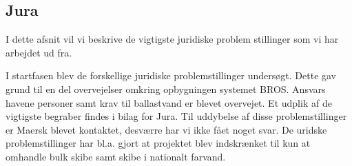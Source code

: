 \subsection{Jura}
I dette afsnit vil vi beskrive de vigtigste juridiske problem stillinger som vi har arbejdet ud fra.

I startfasen blev de forskellige juridiske problemstillinger undersøgt. Dette gav grund til en del overvejelser omkring opbygningen systemet BROS. Ansvars havene personer samt krav til ballastvand er blevet overvejet. Et udplik af de vigtigste begraber findes i bilag for Jura.
Til uddybelse af disse problemstillinger er Maersk blevet kontaktet, desværre har vi ikke fået noget svar. De uridske problemstillinger har bl.a. gjort at projektet blev indskrænket til kun at omhandle bulk skibe samt skibe i nationalt farvand.

